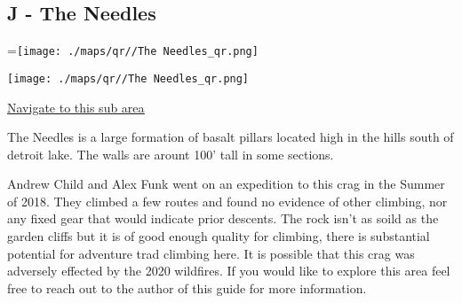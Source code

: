 	\begin{multicols}{2}


\section{J - The Needles}\label{sa:The Needles}
=\hbox{\texttt{[image: ./maps/qr//The Needles\_qr.png]}}%
\begin{center}
\texttt{[image: ./maps/qr//The Needles\_qr.png]}
\end{center}
\begin{center}
\underline{\textcolor{blue}{\href{http://maps.google.com/maps?q=44.59672447306725,-122.15597149494864}{Navigate to this sub area}}}
\end{center}


The Needles is a large formation of basalt pillars located high in the hills south of detroit lake. The walls are arount 100' tall in some sections.

Andrew Child and Alex Funk went on an expedition to this crag in the Summer of 2018. They climbed a few routes and found no evidence of other climbing, nor any fixed gear that would indicate prior descents. The rock isn't as soild as the garden cliffs but it is of good enough quality for climbing, there is substantial potential for adventure trad climbing here. It is possible that this crag was adversely effected by the 2020 wildfires. If you would like to explore this area feel free to reach out to the author of this guide for more information.\\





\end{multicols}
\clearpage